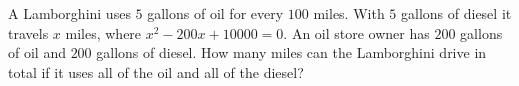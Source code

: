A Lamborghini uses $5$ gallons of oil for every $100$ miles. With $5$ gallons of diesel it travels $x$ miles, where $x^2-200x+10000=0$. An oil store owner has $200$ gallons of oil and $200$ gallons of diesel. How many miles can the Lamborghini drive in total if it uses all of the oil and all of the diesel?
